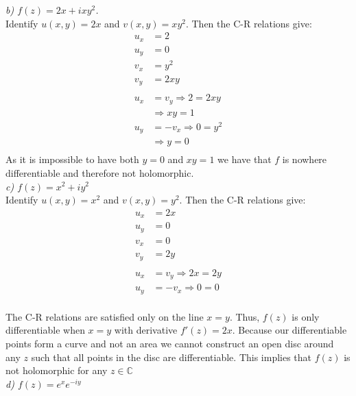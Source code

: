 \documentclass[a4paper, 11pt]{article}
\begin{document}
	\noindent\textit{b) $f(z) = 2x+ixy^2$.} \\ 
	
	\noindent Identify $u(x,y) = 2x$ and $v(x,y) = xy^2$. Then the C-R relations give: 
		\begin{align*}
			u_x &= 2 \\ 
			u_y &= 0 \\ 
			v_x &= y^2 \\ 
			v_y &= 2xy \\ 
			&\quad \\ 
			u_x &= v_y \Rightarrow 2 = 2xy \\ 
				&\Rightarrow xy = 1 \\ 
			u_y &= -v_x \Rightarrow 0 = y^2  \\ 
				&\Rightarrow y = 0 \\ 
		\end{align*}
	As it is impossible to have both $y=0$ and $xy=1$ we have that $f$ is nowhere differentiable and therefore not holomorphic. \\ 
	
	\noindent\textit{c) $f(z)=x^2+iy^2$} \\ 
	
	\noindent Identify $u(x,y)=x^2$ and $v(x,y)=y^2$. Then the C-R relations give: 
		\begin{align*}
			u_x &= 2x \\ 
			u_y &= 0 \\ 
			v_x &= 0 \\ 
			v_y &= 2y \\ 
			&\quad \\ 
			u_x &= v_y \Rightarrow 2x = 2y \\ 
			u_y &= -v_x \Rightarrow 0 = 0 \\ 
		\end{align*}
	
	\noindent The C-R relations are satisfied only on the line $x=y$. Thus, $f(z)$ is only differentiable when $x=y$ with derivative $f'(z) = 2x$. Because our differentiable points form a curve and not an area we cannot construct an open disc around any $z$ such that all points in the disc are differentiable. This implies that $f(z)$ is not holomorphic for any $z\in\mathbb{C}$ \\ 
	
	\noindent\textit{d) $f(z)=e^{x}e^{-iy}$} \\ 
	
\end{document}
